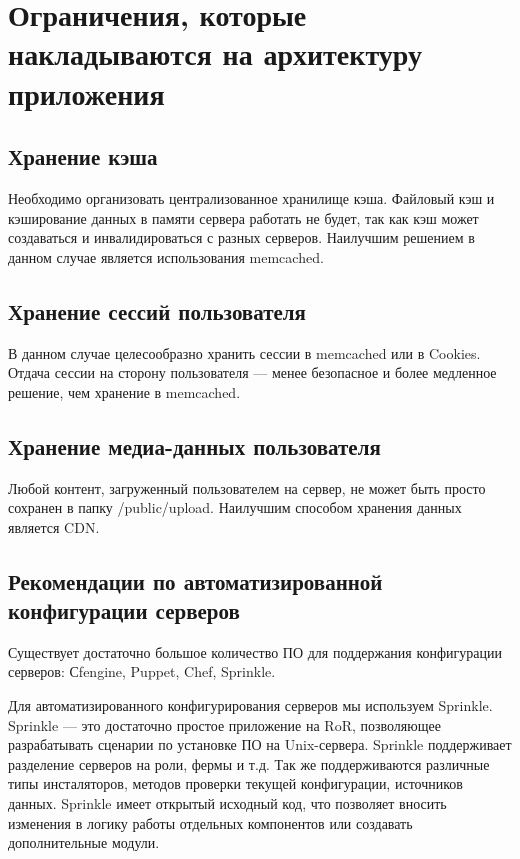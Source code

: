 \documentclass[10pt, a5paper]{article}
\begin{document}
\section*{Ограничения, которые накладываются на архитектуру приложения}

\subsection*{Хранение кэша}
Необходимо организовать централизованное хранилище кэша. Файловый кэш и кэширование данных в памяти сервера работать не будет, так как кэш может создаваться и инвалидироваться с разных серверов. Наилучшим решением в данном случае является использования memcached. 

\subsection*{Хранение сессий пользователя}
В данном случае целесообразно хранить сессии в memcached или в Cookies. Отдача сессии на сторону пользователя --- менее безопасное и более медленное решение, чем хранение в memcached. 

\subsection*{Хранение медиа-данных пользователя}
Любой контент, загруженный пользователем на сервер, не может быть просто  сохранен в папку /public/upload. Наилучшим способом хранения данных является CDN. 

\subsection*{Рекомендации по автоматизированной конфигурации серверов}
Существует достаточно большое количество ПО для поддержания конфигурации серверов: Сfengine, Puppet, Chef, Sprinkle. 

Для автоматизированного конфигурирования серверов мы используем Sprinkle. Sprinkle --- это достаточно простое приложение на RoR, позволяющее разрабатывать сценарии по установке ПО на Unix-сервера.  Sprinkle поддерживает разделение серверов на роли, фермы и т.д. Так же поддерживаются различные типы инсталяторов, методов проверки текущей конфигурации, источников данных. Sprinkle имеет открытый исходный код, что позволяет вносить изменения в логику работы отдельных компонентов или создавать дополнительные модули. 
\end{document}
